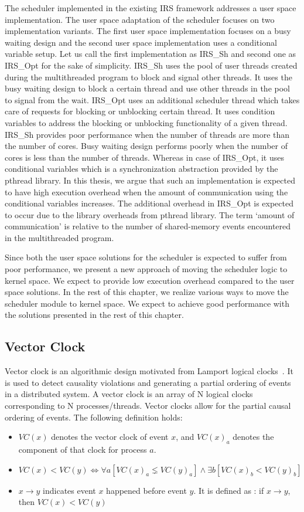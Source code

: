 The scheduler implemented in the existing IRS framework addresses a user space implementation. 
The user space adaptation of the scheduler focuses on two implementation variants. 
The first user space implementation focuses on a busy waiting design and the second user space implementation uses a conditional variable setup. 
Let us call the first implementation as IRS\_Sh and second one as IRS\_Opt for the sake of simplicity. 
IRS\_Sh uses the pool of user threads created during the multithreaded program to block and signal other threads. 
It uses the busy waiting design to block a certain thread and use other threads in the pool to signal from the wait. 
IRS\_Opt uses an additional scheduler thread which takes care of requests for blocking or unblocking certain thread. 
It uses condition variables to address the blocking or unblocking functionality of a given thread. 
IRS\_Sh provides poor performance when the number of threads are more than the number of cores. 
Busy waiting design performs poorly when the number of cores is less than the number of threads. 
Whereas in case of IRS\_Opt, it uses conditional variables which is a synchronization abstraction provided by the pthread library. 
In this thesis, we argue that such an implementation is expected to have high execution overhead when the amount of communication using the conditional variables increases. 
The additional overhead in IRS\_Opt is expected to occur due to the library overheads from pthread library. 
The term `amount of communication' is relative to the number of shared-memory events encountered in the multithreaded program. 

Since both the user space solutions for the scheduler is expected to suffer from poor performance, we present a new approach of moving the scheduler logic to kernel space. 
We expect to provide low execution overhead compared to the user space solutions. 
In the rest of this chapter, we realize various ways to move the scheduler module to kernel space. 
We expect to achieve good performance with the solutions presented in the rest of this chapter.

\subsection{Vector Clock \label{vec_clk}}

Vector clock is an algorithmic design motivated from Lamport logical clocks~\citep{fidge1991logical}. 
It is used to detect causality violations and generating a partial ordering of events in a distributed system. 
A vector clock is an array of N logical clocks corresponding to N processes/threads. 
Vector clocks allow for the partial causal ordering of events.
The following definition holds:
\begin{itemize}
\item $VC(x)$ denotes the vector clock of event $x$, and $VC(x)_a$ denotes the component of that clock for process $a$. 
\item $VC(x) < VC(y) \iff \forall a[VC(x)_a \lneq VC(y)_a] \wedge \exists b[VC(x)_b < VC(y)_b]$
\item $x \to y$ indicates event $x$ happened before event $y$. It is defined as : if $x \to y$, then $VC(x) < VC(y)$
\end{itemize}


